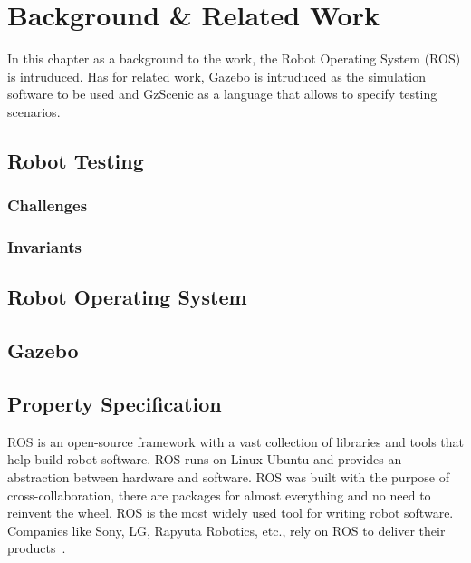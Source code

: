 \chapter{Background \& Related Work}
\label{chap:background}

In this chapter as a background to the work, 
the Robot Operating System (ROS) is intruduced.
Has for related work, Gazebo is intruduced as the simulation software to be used 
and GzScenic as a language that allows to specify testing scenarios.

\section{Robot Testing}
\label{sec:robottesting}

\subsection{Challenges}

\subsection{Invariants}

\section{Robot Operating System}
\label{sec:ros}

\section{Gazebo}
\label{sec:gazebo}

\section{Property Specification}
\label{sec:propspecification}


ROS is an open-source framework with a vast collection 
of libraries and tools that help build robot software. 
ROS runs on Linux Ubuntu and provides an abstraction between hardware and software.
ROS was built with the purpose of cross-collaboration, there are
packages for almost everything and no need to reinvent the wheel.
ROS is the most widely used tool for writing robot software.
Companies like Sony, LG, Rapyuta Robotics, etc., rely on ROS to deliver their products~\cite{Ros}.

